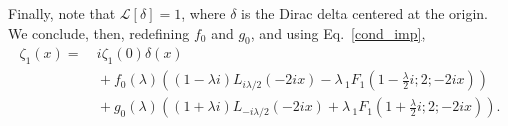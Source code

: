 \documentclass[%
 aip,
 jmp,%
 amsmath,amssymb,
 reprint,%
]{revtex4-2}
\begin{document}
Finally, note that $\mathcal L[\delta] =1$, where $\delta$ is the Dirac delta centered at the origin. We conclude, then, redefining $f_0$ and $g_0$, and using Eq.~\eqref{cond_imp},
\begin{equation}\label{eq:sol-zeta1(x)}
\begin{aligned}
\zeta_1(x)= &~{}i \zeta_1(0)\delta(x) \\%
&~{} + f_0(\lambda) \left(  (1-\lambda i)  L_{i \lambda/2}(-2 i x)  - \lambda \, _1F_1\left(1- \frac{\lambda}2 i ;2;-2 i x \right) \right)\\
&~{} + g_0(\lambda) \left( (1+ \lambda i)L_{-i \lambda/2}(-2 i x) + \lambda \, _1F_1\left(1+  \frac{\lambda}2i ;2;-2 i x \right)\right).
\end{aligned}
\end{equation}
\end{document}
